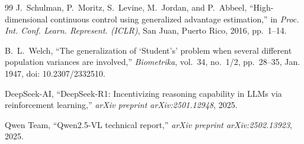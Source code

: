 \documentclass[conference]{IEEEtran}
\begin{document}
\begin{thebibliography}{99}
J.~Schulman, P.~Moritz, S.~Levine, M.~Jordan, and P.~Abbeel, ``High-dimensional continuous control using generalized advantage estimation,'' in \textit{Proc. Int. Conf. Learn. Represent. (ICLR)}, San Juan, Puerto Rico, 2016, pp.~1--14.

B.~L.~Welch, ``The generalization of `Student's' problem when several different population variances are involved,'' \textit{Biometrika}, vol.~34, no.~1/2, pp.~28--35, Jan. 1947, doi: 10.2307/2332510.

DeepSeek-AI, ``DeepSeek-R1: Incentivizing reasoning capability in LLMs via reinforcement learning,'' \textit{arXiv preprint arXiv:2501.12948}, 2025.

Qwen Team, ``Qwen2.5-VL technical report,'' \textit{arXiv preprint arXiv:2502.13923}, 2025.

\end{thebibliography}
\end{document}
